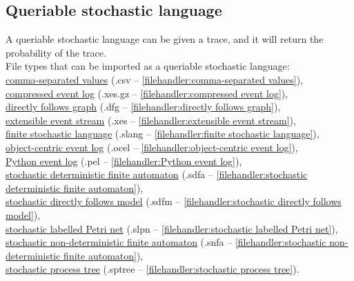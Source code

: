 {\subsection{Queriable stochastic language}
\label{trait:queriable stochastic language}
A queriable stochastic language can be given a trace, and it will return the probability of the trace.
\\File types that can be imported as a queriable stochastic language: \\\null\qquad\hyperref[filehandler:comma-separated values]{comma-separated values} (.csv -- \cref{filehandler:comma-separated values}), \\\null\qquad\hyperref[filehandler:compressed event log]{compressed event log} (.xes.gz -- \cref{filehandler:compressed event log}), \\\null\qquad\hyperref[filehandler:directly follows graph]{directly follows graph} (.dfg -- \cref{filehandler:directly follows graph}), \\\null\qquad\hyperref[filehandler:extensible event stream]{extensible event stream} (.xes -- \cref{filehandler:extensible event stream}), \\\null\qquad\hyperref[filehandler:finite stochastic language]{finite stochastic language} (.slang -- \cref{filehandler:finite stochastic language}), \\\null\qquad\hyperref[filehandler:object-centric event log]{object-centric event log} (.ocel -- \cref{filehandler:object-centric event log}), \\\null\qquad\hyperref[filehandler:Python event log]{Python event log} (.pel -- \cref{filehandler:Python event log}), \\\null\qquad\hyperref[filehandler:stochastic deterministic finite automaton]{stochastic deterministic finite automaton} (.sdfa -- \cref{filehandler:stochastic deterministic finite automaton}), \\\null\qquad\hyperref[filehandler:stochastic directly follows model]{stochastic directly follows model} (.sdfm -- \cref{filehandler:stochastic directly follows model}), \\\null\qquad\hyperref[filehandler:stochastic labelled Petri net]{stochastic labelled Petri net} (.slpn -- \cref{filehandler:stochastic labelled Petri net}), \\\null\qquad\hyperref[filehandler:stochastic non-deterministic finite automaton]{stochastic non-deterministic finite automaton} (.snfa -- \cref{filehandler:stochastic non-deterministic finite automaton}), \\\null\qquad\hyperref[filehandler:stochastic process tree]{stochastic process tree} (.sptree -- \cref{filehandler:stochastic process tree}).
}
